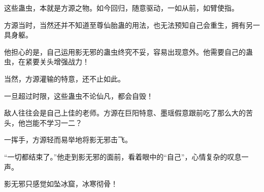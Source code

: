 \begin{this_body}
这些蛊虫，本就是方源之物。如今回归，随意驱动，一如从前，如臂使指。

方源当时，当然还并不知道至尊仙胎蛊的用法，也无法预知自己会重生，拥有另一具身躯。

他担心的是，自己运用影无邪的蛊虫终究不妥，容易出现意外。他需要自己的蛊虫，在紧要关头增强战力！

当然，方源灌输的特意，还不止如此。

一旦超过时限，这些蛊虫不论仙凡，都会自毁！

敌人往往会是自己上佳的老师。方源在巨阳特意、墨瑶假意跟前吃了那么大的苦头，他岂能不学习一二？

一挥手，方源轻而易举地将影无邪击飞。

“一切都结束了。”他走到影无邪的面前，看着眼中的“自己”，心情复杂的叹息一声。

影无邪只感觉如坠冰窟，冰寒彻骨！

\end{this_body}

